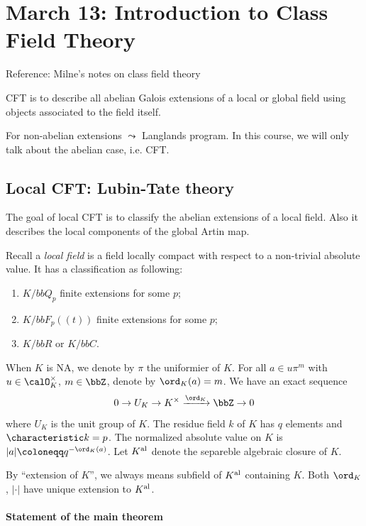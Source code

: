 \section{March 13: Introduction to Class Field Theory}

Reference: Milne's notes on class field theory

\begin{slogan}
    CFT is to describe all abelian Galois extensions of a local or global field using objects associated to the field itself.
\end{slogan}

For non-abelian extensions $\leadsto$ Langlands program.
In this course, we will only talk about the abelian case, i.e. CFT.

\subsection{Local CFT: Lubin-Tate theory}

  The goal of local CFT is to classify the abelian extensions of a local field.
  Also it describes the local components of the global Artin map.

  Recall a \emph{local field} is a field locally compact with respect to a non-trivial absolute value.
  It has a classification as following:
  \begin{enumerate}
      \item $K/bbQ_p$ finite extensions for some $p$;
      \item $K/bbF_p((t))$ finite extensions for some $p$;
      \item $K/bbR$ or $K/bbC$.
  \end{enumerate}
  
  When $K$ is NA, we denote by $\pi$ the uniformier of $K$.
  For all $a \in u \pi^m$ with $u \in \calO_K^\times$, $m \in \bbZ$, denote by $\ord_K(a) = m$.
  We have an exact sequence
  \[ 0 \to U_K \to K^\times \xrightarrow{\ord_K} \bbZ \to 0 \]
  where $U_K$ is the unit group of $K$.
  The residue field $k$ of $K$ has $q$ elements and $\characteristic k = p$.
  The normalized absolute value on $K$ is $|a| \coloneqq q^{- \ord_K (a)}$.
  Let $K^{{\text{al}}}$ denote the separeble algebraic closure of $K$.

  By ``extension of $K$'', we always means subfield of $K^{\text{al}}$ containing $K$.
  Both $\ord_K$, $|\cdot|$ have unique extension to $K^{\text{al}}$.

  \paragraph{Statement of the main theorem}

